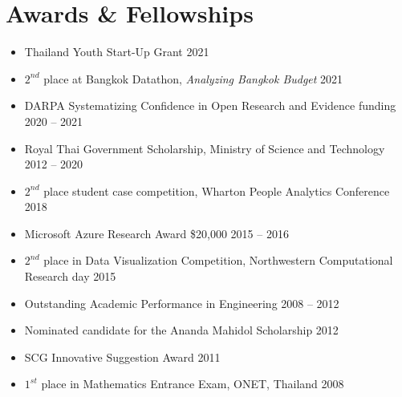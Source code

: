 \section{\sc Awards \& Fellowships}

\begin{itemize}[leftmargin=0cm, label={}]
\itemsep0em

\item Thailand Youth Start-Up Grant \hfill 2021

\item $2^{nd}$ place at Bangkok Datathon, {\em Analyzing Bangkok Budget} \hfill 2021

\item DARPA Systematizing Confidence in Open Research and Evidence funding \hfill 2020 -- 2021

\item Royal Thai Government Scholarship, Ministry of Science and Technology \hfill 2012 -- 2020

\item $2^{nd}$ place student case competition, Wharton People Analytics Conference \hfill 2018

\item Microsoft Azure Research Award \$20,000 \hfill 2015 -- 2016

\item $2^{nd}$ place in Data Visualization Competition, Northwestern Computational Research day \hfill 2015

\item Outstanding Academic Performance in Engineering	\hfill 2008 -- 2012

\item Nominated candidate for the Ananda Mahidol Scholarship \hfill 2012

\item SCG Innovative Suggestion Award	\hfill 2011

\item $1^{st}$ place in Mathematics Entrance Exam, ONET, Thailand \hfill 2008\\

\end{itemize}

